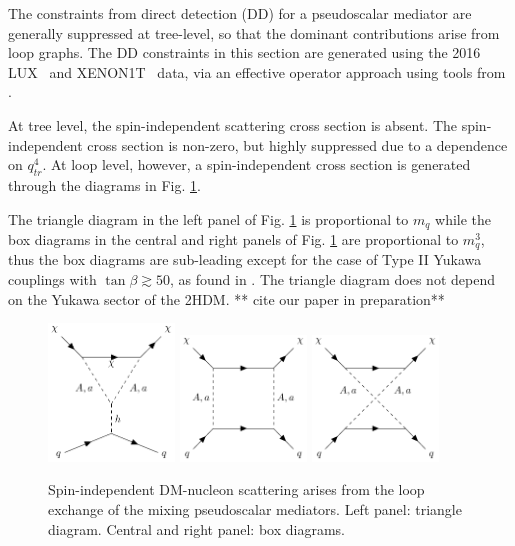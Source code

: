 The constraints from direct detection (DD) for a pseudoscalar mediator are generally suppressed at tree-level, so that the dominant contributions arise from loop graphs. 
The DD constraints in this section are generated using the 2016 LUX~\citep{Akerib:2016vxi} and XENON1T~\citep{Aprile:2017iyp} data, via an effective operator approach using tools from \citep{DelNobile:2013sia}. 

At tree level, the spin-independent scattering cross section is absent. The spin-independent cross section is non-zero, but highly suppressed due to a dependence on $q_{tr}^4$. 
At loop level, however, a spin-independent cross section is generated through the diagrams in Fig. \ref{fig:feynDDPS}. 

The triangle diagram in the left panel of Fig. \ref{fig:feynDDPS} is proportional to $m_q$ while the box diagrams in the central and right panels of Fig. \ref{fig:feynDDPS} are proportional to $m_q^3$, thus the box diagrams are sub-leading except for the case of Type II Yukawa couplings with $\tan\beta\gtrsim50$, as found in \citep{Ipek:2014gua}.
The triangle diagram does not depend on the Yukawa sector of the 2HDM. ** cite our paper in preparation**

\begin{figure}[ht]
    \centering
    \includegraphics[width=0.3\textwidth]{texinputs/06_comparisons/figures/pseudoTriangle.pdf} \hspace{0.02\textwidth}
    \includegraphics[width=0.3\textwidth]{texinputs/06_comparisons/figures/pseudoBox.pdf} \hspace{0.02\textwidth}
    \includegraphics[width=0.3\textwidth]{texinputs/06_comparisons/figures/pseudoBox2.pdf} 
    \caption{Spin-independent DM-nucleon scattering arises from the loop exchange of the mixing pseudoscalar mediators. Left panel: triangle diagram. Central and right panel: box diagrams.}
    \label{fig:feynDDPS}
\end{figure}

